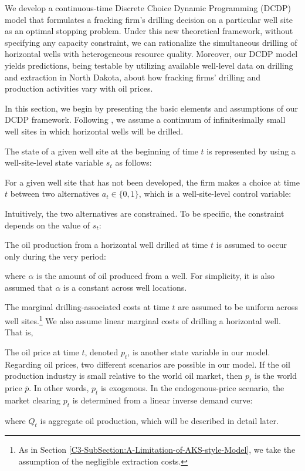We develop a continuous-time Discrete Choice Dynamic Programming (DCDP) model that formulates a fracking firm's drilling decision on a particular well site as an optimal stopping problem. Under this new theoretical framework, without specifying any capacity constraint, we can rationalize the simultaneous drilling of horizontal wells with heterogeneous resource quality.   
Moreover, our DCDP model yields predictions, being testable by utilizing available well-level data on drilling and extraction in North Dakota, about how fracking firms' drilling and production activities vary with oil prices. 

In this section, we begin by presenting the basic elements and assumptions of our DCDP framework. Following \cite{Hotelling-under-Pressure_AKS_2018}, we assume a continuum of infinitesimally small well sites in which horizontal wells will be drilled. 

The state of a given well site at the beginning of time $t$ is represented by using a well-site-level state variable $s_{t}$ as follows:


For a given well site that has not been developed, the firm makes a choice at time $t$ between two alternatives $a_{t} \in \{ 0, 1 \}$, which is a well-site-level control variable:

Intuitively, the two alternatives are constrained. To be specific, the constraint depends on the value of $s_{t}$:


The oil production from a horizontal well drilled at time $t$ is assumed to occur only during the very period:

where $\alpha$ is the amount of oil produced from a well. For simplicity, it is also assumed that $\alpha$ is a constant across well locations.

The marginal drilling-associated costs at time $t$ are assumed to be uniform across well sites.\footnote{As in Section \ref{C3-SubSection:A-Limitation-of-AKS-style-Model}, we take the assumption of the negligible extraction costs.} We also assume linear marginal costs of drilling a horizontal well. That is, 


The oil price at time $t$, denoted $p_{t}$, is another state variable in our model. Regarding oil prices, two different scenarios are possible in our model. If the oil production industry is small relative to the world oil market, then $p_{t}$ is the world price $\bar{p}$. In other words, $p_{t}$ is exogenous. In the endogenous-price scenario, the market clearing $p_{t}$ is determined from a linear inverse demand curve:

where $Q_{t}$ is aggregate oil production, which will be described in detail later. 


